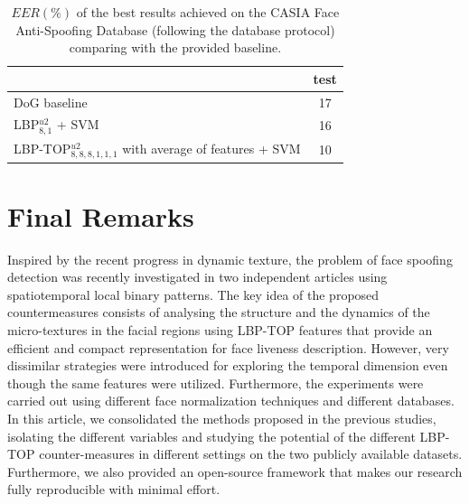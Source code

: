 \begin{table}
   \caption{$EER(\%)$ of the best results achieved on the CASIA Face Anti-Spoofing Database (following the database protocol) comparing with the provided baseline.}
   \begin{center}

     \begin{tabular}{l | c |}
         \cline{2-2}
         & \textbf{test} \\ \hline
         \multicolumn{1}{|l|}{DoG baseline \cite{zhangface}} & 17 \\ \hline
         \multicolumn{1}{|l|}{LBP$_{8,1}^{u2}$ + SVM} & 16 \\ \hline
         \multicolumn{1}{|l|}{LBP-TOP$^{u2}_{8,8,8,1,1,1}$ with average of features + SVM} & 10  \\ \hline

     \end{tabular}
   \end{center}
   \label{tb_CASIA_Results}
\end{table}


\section{Final Remarks}
\label{sec_conclusion}

Inspired by the recent progress in dynamic texture, the problem of face spoofing detection was recently investigated in two independent articles using spatiotemporal local binary patterns. The key idea of the proposed countermeasures consists of analysing the structure and the dynamics of the micro-textures in the facial regions using LBP-TOP features that provide an efficient and compact representation for face liveness description. However, very dissimilar strategies were introduced for exploring the temporal dimension even though the same features were utilized. Furthermore, the experiments were carried out using different face normalization techniques and different databases. In this article, we consolidated the methods proposed in the previous studies, isolating the different variables and studying the potential of the different LBP-TOP counter-measures in different settings on the two publicly available datasets. Furthermore, we also provided an open-source framework that makes our research fully reproducible with minimal effort.

